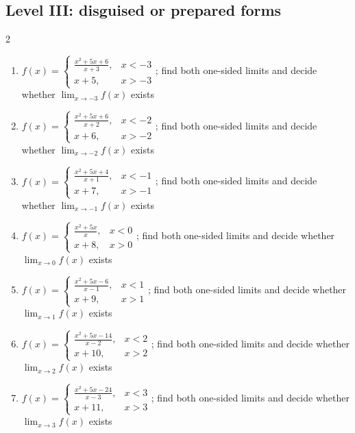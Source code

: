 \documentclass[11pt,oneside]{book}
\begin{document}
\subsection*{Level III: disguised or prepared forms}
\begin{multicols}{2}
\begin{enumerate}[leftmargin=*,label=\textbf{\arabic*.},itemsep=0.65\baselineskip]
\item $f(x)=\begin{cases} \frac{x^{2} + 5 x + 6}{x + 3}, & x<-3\\ x + 5, & x>-3 \end{cases}$; find both one-sided limits and decide whether $\lim_{x\to -3}f(x)$ exists
\item $f(x)=\begin{cases} \frac{x^{2} + 5 x + 6}{x + 2}, & x<-2\\ x + 6, & x>-2 \end{cases}$; find both one-sided limits and decide whether $\lim_{x\to -2}f(x)$ exists
\item $f(x)=\begin{cases} \frac{x^{2} + 5 x + 4}{x + 1}, & x<-1\\ x + 7, & x>-1 \end{cases}$; find both one-sided limits and decide whether $\lim_{x\to -1}f(x)$ exists
\item $f(x)=\begin{cases} \frac{x^{2} + 5 x}{x}, & x<0\\ x + 8, & x>0 \end{cases}$; find both one-sided limits and decide whether $\lim_{x\to 0}f(x)$ exists
\item $f(x)=\begin{cases} \frac{x^{2} + 5 x - 6}{x - 1}, & x<1\\ x + 9, & x>1 \end{cases}$; find both one-sided limits and decide whether $\lim_{x\to 1}f(x)$ exists
\item $f(x)=\begin{cases} \frac{x^{2} + 5 x - 14}{x - 2}, & x<2\\ x + 10, & x>2 \end{cases}$; find both one-sided limits and decide whether $\lim_{x\to 2}f(x)$ exists
\item $f(x)=\begin{cases} \frac{x^{2} + 5 x - 24}{x - 3}, & x<3\\ x + 11, & x>3 \end{cases}$; find both one-sided limits and decide whether $\lim_{x\to 3}f(x)$ exists

\end{enumerate}
\end{multicols}
\end{document}
